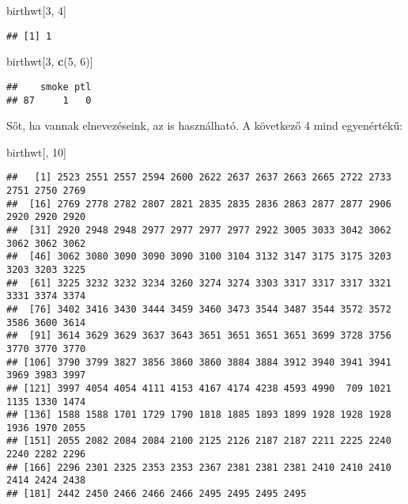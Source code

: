 \documentclass[]{book}
\newenvironment{Shaded}{\begin{snugshade}}{\end{snugshade}}
\newcommand{\DecValTok}[1]{\textcolor[rgb]{0.00,0.00,0.81}{#1}}
\newcommand{\KeywordTok}[1]{\textcolor[rgb]{0.13,0.29,0.53}{\textbf{#1}}}
\newcommand{\NormalTok}[1]{#1}
\begin{document}
\begin{Shaded}
\begin{Highlighting}[]
\NormalTok{birthwt[}\DecValTok{3}\NormalTok{, }\DecValTok{4}\NormalTok{]}
\end{Highlighting}
\end{Shaded}

\begin{verbatim}
## [1] 1
\end{verbatim}

\begin{Shaded}
\begin{Highlighting}[]
\NormalTok{birthwt[}\DecValTok{3}\NormalTok{, }\KeywordTok{c}\NormalTok{(}\DecValTok{5}\NormalTok{, }\DecValTok{6}\NormalTok{)]}
\end{Highlighting}
\end{Shaded}

\begin{verbatim}
##    smoke ptl
## 87     1   0
\end{verbatim}

Sőt, ha vannak elnevezéseink, az is használható. A következő 4 mind egyenértékű:

\begin{Shaded}
\begin{Highlighting}[]
\NormalTok{birthwt[, }\DecValTok{10}\NormalTok{]}
\end{Highlighting}
\end{Shaded}

\begin{verbatim}
##   [1] 2523 2551 2557 2594 2600 2622 2637 2637 2663 2665 2722 2733 2751 2750 2769
##  [16] 2769 2778 2782 2807 2821 2835 2835 2836 2863 2877 2877 2906 2920 2920 2920
##  [31] 2920 2948 2948 2977 2977 2977 2977 2922 3005 3033 3042 3062 3062 3062 3062
##  [46] 3062 3080 3090 3090 3090 3100 3104 3132 3147 3175 3175 3203 3203 3203 3225
##  [61] 3225 3232 3232 3234 3260 3274 3274 3303 3317 3317 3317 3321 3331 3374 3374
##  [76] 3402 3416 3430 3444 3459 3460 3473 3544 3487 3544 3572 3572 3586 3600 3614
##  [91] 3614 3629 3629 3637 3643 3651 3651 3651 3651 3699 3728 3756 3770 3770 3770
## [106] 3790 3799 3827 3856 3860 3860 3884 3884 3912 3940 3941 3941 3969 3983 3997
## [121] 3997 4054 4054 4111 4153 4167 4174 4238 4593 4990  709 1021 1135 1330 1474
## [136] 1588 1588 1701 1729 1790 1818 1885 1893 1899 1928 1928 1928 1936 1970 2055
## [151] 2055 2082 2084 2084 2100 2125 2126 2187 2187 2211 2225 2240 2240 2282 2296
## [166] 2296 2301 2325 2353 2353 2367 2381 2381 2381 2410 2410 2410 2414 2424 2438
## [181] 2442 2450 2466 2466 2466 2495 2495 2495 2495
\end{verbatim}
\end{document}
